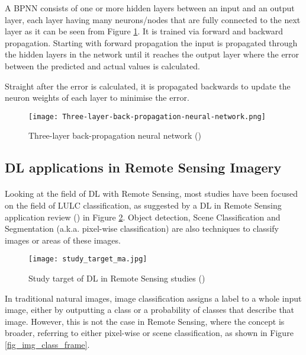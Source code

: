 A \gls{BPNN} consists of one or more hidden layers between an input and an output layer, each layer having many neurons/nodes that are fully connected to the next layer as it can be seen from Figure \ref{fig_bpnn}. It is trained via forward and backward propagation. Starting with forward propagation the input is propagated through the hidden layers in the network until it reaches the output layer where the error between the predicted and actual values is calculated. 

Straight after the error is calculated, it is propagated backwards to update the neuron weights of each layer to minimise the error.

    \begin{figure}[hbt!]
        \centering
        \texttt{[image: Three-layer-back-propagation-neural-network.png]}
        \caption{Three-layer back-propagation neural network (\cite{NNpic})}
        \label{fig_bpnn}
    \end{figure}

\subsection{\gls{DL} applications in Remote Sensing Imagery} \label{dl_rs}
\paragraph{}
Looking at the field of \gls{DL} with Remote Sensing, most studies have been focused on the field of \gls{LULC} classification, as suggested by a \gls{DL} in Remote Sensing application review (\cite{MA2019166}) in Figure \ref{fig_dl_studies}. Object detection, Scene Classification and Segmentation (\gls{a.k.a.} pixel-wise classification) are also techniques to classify images or areas of these images.

    \begin{figure}[hbt!]
        \centering
        \texttt{[image: study\_target\_ma.jpg]}
        \caption{Study target of \gls{DL} in Remote Sensing studies (\cite{MA2019166})}
        \label{fig_dl_studies}
    \end{figure}

In traditional natural images, image classification assigns a label to a whole input image, either by outputting a class or a probability of classes that describe that image. However, this is not the case in Remote Sensing, where the concept is broader, referring to either pixel-wise or scene classification, as shown in Figure \ref{fig_img_class_frame}.

